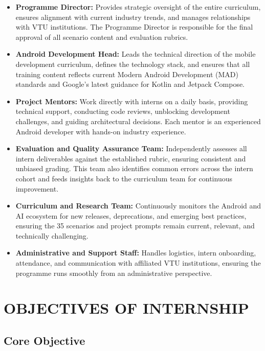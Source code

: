 \documentclass[12pt,a4paper]{report}
\begin{document}
\begin{itemize}
    \item \textbf{Programme Director:} Provides strategic oversight of the entire curriculum, ensures alignment with current industry trends, and manages relationships with VTU institutions. The Programme Director is responsible for the final approval of all scenario content and evaluation rubrics.
    \item \textbf{Android Development Head:} Leads the technical direction of the mobile development curriculum, defines the technology stack, and ensures that all training content reflects current Modern Android Development (MAD) standards and Google's latest guidance for Kotlin and Jetpack Compose.
    \item \textbf{Project Mentors:} Work directly with interns on a daily basis, providing technical support, conducting code reviews, unblocking development challenges, and guiding architectural decisions. Each mentor is an experienced Android developer with hands-on industry experience.
    \item \textbf{Evaluation and Quality Assurance Team:} Independently assesses all intern deliverables against the established rubric, ensuring consistent and unbiased grading. This team also identifies common errors across the intern cohort and feeds insights back to the curriculum team for continuous improvement.
    \item \textbf{Curriculum and Research Team:} Continuously monitors the Android and AI ecosystem for new releases, deprecations, and emerging best practices, ensuring the 35 scenarios and project prompts remain current, relevant, and technically challenging.
    \item \textbf{Administrative and Support Staff:} Handles logistics, intern onboarding, attendance, and communication with affiliated VTU institutions, ensuring the programme runs smoothly from an administrative perspective.
\end{itemize}

\newpage

\chapter{OBJECTIVES OF INTERNSHIP}

\section{Core Objective}
\end{document}
